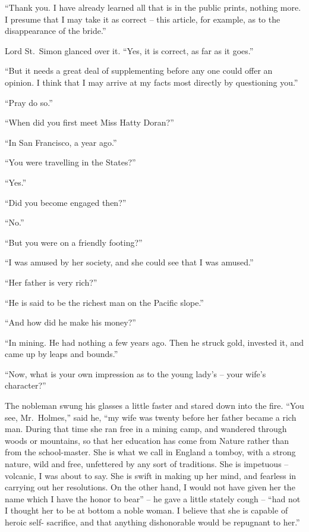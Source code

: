 “Thank you. I have already learned all that is in the
public prints, nothing more. I presume that I may take it as
correct -- this article, for example, as to the disappearance of
the bride.”

Lord St.~Simon glanced over it. “Yes, it is correct, as far
as it goes.”

“But it needs a great deal of supplementing before any one
could offer an opinion. I think that I may arrive at my
facts most directly by questioning you.”

“Pray do so.”

“When did you first meet Miss Hatty Doran?”

“In San Francisco, a year ago.”

“You were travelling in the States?”

“Yes.”

“Did you become engaged then?”

“No.”

“But you were on a friendly footing?”

“I was amused by her society, and she could see that I
was amused.”

“Her father is very rich?”

“He is said to be the richest man on the Pacific slope.”

“And how did he make his money?”

“In mining. He had nothing a few years ago. Then he
struck gold, invested it, and came up by leaps and bounds.”

“Now, what is your own impression as to the young lady’s -- your
wife’s character?”

The nobleman swung his glasses a little faster and stared
down into the fire. “You see, Mr.~Holmes,” said he, “my
wife was twenty before her father became a rich man. During
that time she ran free in a mining camp, and wandered
through woods or mountains, so that her education has
come from Nature rather than from the school-master. She
is what we call in England a tomboy, with a strong nature,
wild and free, unfettered by any sort of traditions. She
is impetuous -- volcanic, I was about to say. She is swift in
making up her mind, and fearless in carrying out her resolutions.
On the other hand, I would not have given her the
name which I have the honor to bear” -- he gave a little
stately cough -- “had not I thought her to be at bottom a
noble woman. I believe that she is capable of heroic self-%
sacrifice, and that anything dishonorable would be repugnant
to her.”

